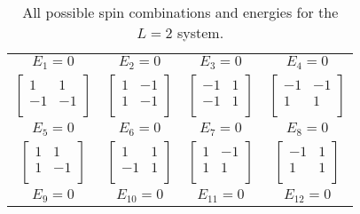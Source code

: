 \documentclass[11pt,a4wide]{article}
\begin{document}
\begin{table}
\centering
\caption{All possible spin combinations and energies for the $L=2$ system.}
\begin{tabular}{cccc}
$E_1 = 0$ & $E_2 = 0$ & $E_3 = 0$& $E_4 = 0$ \\ 
$\left[ \begin{array}{cc} 1 & 1 \\
                             	    -1  & -1 \\
\end{array} \right]$ & 
$
\left[ \begin{array}{cc} 1 & -1 \\
                             	    1  & -1 \\
\end{array} \right]$ &
$
\left[ \begin{array}{cc} -1 & 1 \\
                             	    -1  & 1 \\
\end{array} \right]$ & 
$
\left[ \begin{array}{cc} -1 & -1 \\
                             	    1  & 1 \\
\end{array} \right] $ \\
$E_5 = 0$ & $E_6 = 0$ & $E_7 = 0$& $E_8 = 0$ \\ 
$
\left[ \begin{array}{cc} 1 & 1 \\
                             	    1  & -1 \\
\end{array} \right]$ &
$
\left[ \begin{array}{cc} 1 & 1 \\
                             	    -1  & 1 \\
\end{array} \right]$ &
$
\left[ \begin{array}{cc} 1 & -1 \\
                             	    1  & 1 \\
\end{array} \right]$ &
$
\left[ \begin{array}{cc} -1 & 1 \\
                             	    1  & 1 \\
\end{array} \right]$ \\
$E_9 = 0$ & $E_{10} = 0$ & $E_{11} = 0$& $E_{12} = 0$ \\ 

\end{tabular}
\end{table}
\end{document}

